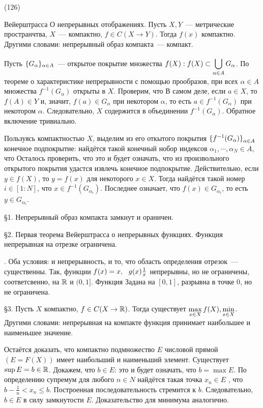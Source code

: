 (126)

\T \q Вейерштрасса О непрерывных отображениях. Пусть $X, Y$~--- метрические пространчтва, $X$~--- компактно, $f \in C(X\to Y)$. Тогда $f(x)$ компактно. Другими словами: непрерывный образ компакта~--- компакт.

\D Пусть $\{G_{\alpha}\}_{\alpha \in A}$~--- открытое покрытие множества $f(X): f(X) \subset \displaystyle \bigcup\limits^{}_{\alpha \in A} G_\alpha$. По теореме о характеристике непрерывности с помощью прообразов, при всех $\alpha \in A$ множества $f^{-1}(G_\alpha)$ открыты в $X$. Проверим, что  В самом деле, если $a \in X$, то $f(A) \in Y$ и, значит, $f(a) \in G_\alpha$ при некотором $\alpha$, то есть $a \in f^{-1}(G_\alpha)$ при некотором $\alpha$. Следовательно, $X$ содержится в объединении $f^{-1} (G_\alpha)$. Обратное включение тривиально.

Пользуясь компактностью $X$, выделим из его откытого покрытия $\{f^{-1}(G_\alpha)\}^{}_{\alpha \in A}$ конечное подпокрытие: найдётся такой конечный нобор индексов $\alpha_1, \cdots, \alpha_N \in A$, что
 Осталось проверить, что  это и будет означать, что из произвольного открытого покрытия удастся извлечь конечное подпокрытие. Действительно, если $y \in f(X)$, то $y = f(x)$ для некоторого $x \in X$. Тогда найдётся такой номер $i \in [1:N]$, что $x \in f^{-1}(G_{\alpha_i})$. Последнее означает, что $f(x) \in G_{\alpha_i}$, то есть $y \in G_{\alpha_i}$.

\S1. Непрерывный образ компакта замкнут и ораничен.

\S2. \q Первая теорема Вейерштрасса о непрерывных функциях. Функция непрерывная на отрезке ограничена.

. Оба условия: и непрерывность, и то, что область определения отрезок~--- существенны. Так, функции $f(x) = x,\ \  g(x) \frac 1x$ непрерывны, но не ограничены, соответсвенно, на $\mathbb{R}$ и $(0, 1]$. Функция \F{$h(x) = \begin{cases} \frac 1x, & x \in (0,1],\\0, & x = 0.\end{cases}$} Задана на $[0, 1]$, разрывна в точке 0, но не ограничена.

\S3. Пусть $X$ компактно, $f \in C(X\to \mathbb{R})$. Тогда существует $\displaystyle \max\limits^{}_{x \in X} f(X), \displaystyle \min\limits^{}_{x \in X}$. Другими словами: непрерывная на компакте функция принимает наибольшее и наименьшее значение.

\D Остаётся доказать, что компактно подмножество $E$ числовой прямой $(E = F(X))$ имеет наибольший и наименьший элемент. Существует  $\sup E = b \in \mathbb{R}$. Докажем, что $b \in E$: это и будет означать, что $b = \max E$. По определению супремум для любого $n \in N$ найдётся такая точка $x_n \in E$ , что $b - \frac 1n < x_n \le b$. Построенная последовательность стремится к $b$. Следовательно, $b \in E$ в силу замкнутости $E$. Доказательство для минимума аналогично.

